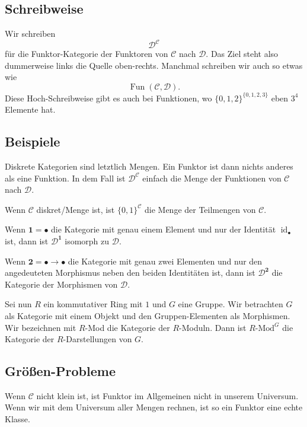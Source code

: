 \documentclass[a4paper]{amsart}
\theoremstyle{definition}
\DeclareMathOperator{\id}{id}
\newcommand{\CC}{\ensuremath{\mathcal{ C }}}
\newcommand{\DD}{\ensuremath{\mathcal{ D }}}
\begin{document}
\subsection{Schreibweise}
Wir schreiben 
\begin{equation}
   \DD^\CC
\end{equation}
für die Funktor-Kategorie der Funktoren von $\CC$ nach $\DD$. Das Ziel steht also dummerweise links die Quelle oben-rechts.
Manchmal schreiben wir auch so etwas wie
\begin{equation}
   \operatorname{Fun}( \CC, \DD).
\end{equation}
Diese Hoch-Schreibweise gibt es auch bei Funktionen, wo $\{0,1,2\}^{\{0,1,2,3\}}$ eben $3^4$ Elemente hat.

\subsection{Beispiele}

Diskrete Kategorien sind letztlich Mengen. Ein Funktor ist dann nichts anderes als eine Funktion. In dem Fall ist $\DD^\CC$ einfach die Menge der Funktionen von $\CC$ nach $\DD$.

Wenn $\CC$ diskret/Menge ist, ist $\{0,1\}^\CC$ die Menge der Teilmengen von $\CC$.

Wenn $\boldsymbol 1 =  \bullet$ die Kategorie mit genau einem Element und nur der Identität $\id_\bullet$ ist, dann ist $\DD^{\boldsymbol{1}}$ isomorph zu $\DD$.

Wenn $\boldsymbol 2 = \bullet \to \bullet$ die Kategorie mit genau zwei Elementen und nur den angedeuteten Morphismus neben den beiden Identitäten ist, dann ist $\DD^{\boldsymbol{2}}$ die Kategorie der Morphismen von $\DD$.

Sei nun $R$ ein kommutativer Ring mit $1$ und $G$ eine Gruppe. Wir betrachten $G$ als Kategorie mit einem Objekt und den Gruppen-Elementen als Morphismen. Wir bezeichnen mit $R$-Mod die Kategorie der $R$-Moduln. Dann ist $\text{$R$-Mod}^G$ die Kategorie der $R$-Darstellungen von $G$.

\subsection{Größen-Probleme}
Wenn $\CC$ nicht klein ist, ist Funktor im Allgemeinen nicht in unserem Universum. Wenn wir mit dem Universum aller Mengen rechnen, ist so ein Funktor eine echte Klasse.
\end{document}
